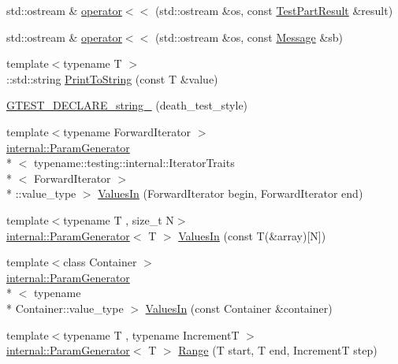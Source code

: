 \begin{DoxyCompactItemize}
\item 
std\-::ostream \& \hyperlink{namespacetesting_a7c88897836b9f492190fb2b9dfa3a327}{operator$<$$<$} (std\-::ostream \&os, const \hyperlink{classtesting_1_1_test_part_result}{Test\-Part\-Result} \&result)
\item 
std\-::ostream \& \hyperlink{namespacetesting_a2d038049296f23fb404311f974788cd3}{operator$<$$<$} (std\-::ostream \&os, const \hyperlink{classtesting_1_1_message}{Message} \&sb)
\item 
{\footnotesize template$<$typename T $>$ }\\\-::std\-::string \hyperlink{namespacetesting_aa5717bb1144edd1d262d310ba70c82ed}{Print\-To\-String} (const T \&value)
\item 
\hyperlink{namespacetesting_a37b7e87f0a5f502c6918f37d1768c1f3}{G\-T\-E\-S\-T\-\_\-\-D\-E\-C\-L\-A\-R\-E\-\_\-string\-\_\-} (death\-\_\-test\-\_\-style)
\item 
{\footnotesize template$<$typename Forward\-Iterator $>$ }\\\hyperlink{classtesting_1_1internal_1_1_param_generator}{internal\-::\-Param\-Generator}\\*
$<$ typename\-::testing\-::internal\-::\-Iterator\-Traits\\*
$<$ Forward\-Iterator $>$\\*
\-::value\-\_\-type $>$ \hyperlink{namespacetesting_a5f8e1eb074d24671d679f6ccda6710bc}{Values\-In} (Forward\-Iterator begin, Forward\-Iterator end)
\item 
{\footnotesize template$<$typename T , size\-\_\-t N$>$ }\\\hyperlink{classtesting_1_1internal_1_1_param_generator}{internal\-::\-Param\-Generator}$<$ T $>$ \hyperlink{namespacetesting_affa90ba3821bd7ac15f147b1c31f9a73}{Values\-In} (const T(\&array)\mbox{[}N\mbox{]})
\item 
{\footnotesize template$<$class Container $>$ }\\\hyperlink{classtesting_1_1internal_1_1_param_generator}{internal\-::\-Param\-Generator}\\*
$<$ typename \\*
Container\-::value\-\_\-type $>$ \hyperlink{namespacetesting_aa67d0c8470c5f69fcfcacc9e775fa982}{Values\-In} (const Container \&container)
\item 
{\footnotesize template$<$typename T , typename Increment\-T $>$ }\\\hyperlink{classtesting_1_1internal_1_1_param_generator}{internal\-::\-Param\-Generator}$<$ T $>$ \hyperlink{namespacetesting_a265ed70a86cf2d6641582c45ad9529e2}{Range} (T start, T end, Increment\-T step)

\end{DoxyCompactItemize}
